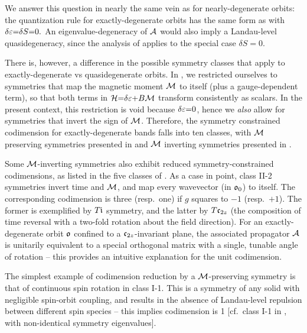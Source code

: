 \documentclass[aps, showpacs, twocolumn, notitlepage, superscriptaddress]{revtex4-1}
\begin{document}
We answer this question in nearly the same vein as for nearly-degenerate orbits: the quantization rule for exactly-degenerate orbits\cite{topoferm} has the same form as  with $\delta \varepsilon{=}\delta S{=}0.$ An eigenvalue-degeneracy of ${\cal A}$ would also imply a Landau-level quasidegeneracy, since the analysis of  applies to the special case $\delta S{=}0$. 

There is, however, a difference in the possible symmetry classes that apply to exactly-degenerate vs quasidegenerate orbits.  In , we restricted ourselves to symmetries  that map the magnetic moment  ${\cal M}$ to itself (plus a gauge-dependent term\cite{100p}), so that both terms in ${\cal H}{=}\delta \varepsilon{+}B{\cal M}$ transform consistently as scalars. In the present context, this restriction is void because $\delta\varepsilon{=}0$, hence we \textit{also} allow for symmetries that invert the sign of ${\cal M}$. Therefore, the symmetry constrained codimension for exactly-degenerate bands falls into ten classes, with  ${\cal M}$ preserving symmetries presented in  and ${\cal M}$ inverting symmetries presented in .

Some ${\cal M}$-inverting symmetries also exhibit reduced symmetry-constrained codimensions, as listed in the five classes of . As a case in point, class II-2 symmetries invert time and ${\cal M}$, and map every wavevector (in $\mathfrak{o}_0$) to itself. The corresponding codimension is three (resp.\ one) if $g$ squares to $-1$ (resp.\ $+1$). The former is exemplified by $T\mathfrak{i}$ symmetry, and the latter by $T\mathfrak{c}_{2z}$ (the composition of time reversal with a two-fold rotation about the field direction). For an exactly-degenerate orbit $\mathfrak{o}$ confined to a $\mathfrak{c}_{2z}$-invariant plane, the associated propagator ${\cal A}$ is unitarily equivalent to a special orthogonal matrix\cite{100p,alexandradinata_berry-phase_2016} with a single, tunable angle of rotation -- this provides an intuitive explanation for the unit codimension.

The simplest example of codimension reduction by a ${\cal M}$-preserving symmetry is that of continuous spin rotation in class I-1. This is a symmetry of any solid with negligible spin-orbit coupling, and results in the absence of Landau-level repulsion between different spin species -- this implies codimension is 1 [cf.\ class I-1 in , with non-identical symmetry eigenvalues].
\end{document}
